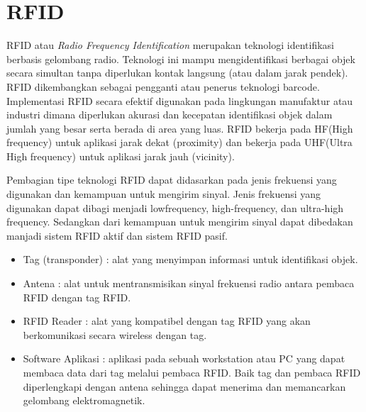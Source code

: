 \section{RFID}
RFID atau \textit{Radio Frequency Identification} merupakan teknologi identifikasi berbasis gelombang radio. Teknologi ini mampu mengidentifikasi berbagai objek secara simultan tanpa diperlukan kontak langsung (atau dalam jarak pendek). RFID dikembangkan sebagai pengganti atau penerus teknologi barcode. Implementasi RFID secara efektif digunakan pada lingkungan manufaktur atau industri dimana diperlukan akurasi dan kecepatan identifikasi objek dalam jumlah yang besar serta berada di area yang luas. RFID bekerja pada HF(High frequency) untuk aplikasi jarak dekat (proximity) dan bekerja pada UHF(Ultra High frequency) untuk aplikasi jarak jauh (vicinity).

Pembagian tipe teknologi RFID dapat didasarkan pada jenis frekuensi yang digunakan dan kemampuan untuk mengirim sinyal. Jenis frekuensi yang digunakan dapat dibagi menjadi lowfrequency, high-frequency, dan ultra-high frequency. Sedangkan dari kemampuan untuk mengirim sinyal dapat dibedakan manjadi sistem RFID aktif dan sistem RFID pasif. 
\begin{itemize}
\item Tag (transponder) : alat yang menyimpan informasi untuk identifikasi objek.
\item Antena : alat untuk mentransmisikan sinyal frekuensi radio antara pembaca RFID dengan tag RFID.
\item RFID Reader : alat yang kompatibel dengan tag RFID yang akan berkomunikasi secara wireless dengan tag.
\item Software Aplikasi : aplikasi pada sebuah workstation atau PC yang dapat membaca data dari tag melalui pembaca RFID. Baik tag dan pembaca RFID diperlengkapi dengan antena sehingga dapat menerima dan memancarkan gelombang elektromagnetik.
\end{itemize}
